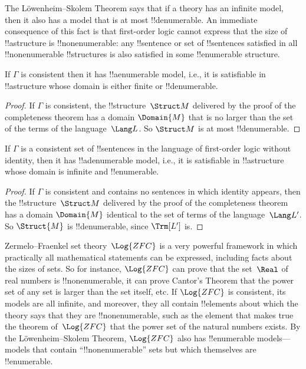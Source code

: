 \documentclass[../../../include/open-logic-section]{subfiles}
\begin{document}

The L\"owenheim--Skolem Theorem says that if a theory has an infinite
model, then it also has a model that is at most !!{denumerable}. An
immediate consequence of this fact is that first-order logic cannot
express that the size of !!a{structure} is !!{nonenumerable}: any
!!{sentence} or set of !!{sentence}s satisfied in all
!!{nonenumerable} !!{structure}s is also satisfied in some
!!{enumerable} structure.

\begin{thm} 
 If $\Gamma$ is consistent then it has
!!a{enumerable} model, i.e., it is satisfiable in !!a{structure}
whose domain is either finite or !!{denumerable}.
\end{thm}

\begin{proof}
If $\Gamma$ is consistent, the !!{structure}~$\Struct M$ delivered by
the proof of the completeness theorem has a domain $\Domain{M}$ that
is no larger than the set of the terms of the language~$\Lang L$. So
$\Struct M$ is at most !!{denumerable}.
\end{proof}

\begin{thm}
 If $\Gamma$ is a consistent set of !!{sentence}s
in the language of first-order logic without identity, then it has
!!a{denumerable} model, i.e., it is satisfiable in !!a{structure}
whose domain is infinite and !!{enumerable}.
\end{thm}

\begin{proof}
If $\Gamma$ is consistent and contains no sentences in which identity
appears, then the !!{structure}~$\Struct M$ delivered by the proof of
the completeness theorem has a domain $\Domain{M}$ identical to the set
of terms of the language~$\Lang L'$. So $\Struct{M}$ is
!!{denumerable}, since $\Trm[L']$ is.
\end{proof}

\begin{ex}
Zermelo--Fraenkel set theory~$\Log{ZFC}$ is a very powerful framework
in which practically all mathematical statements can be expressed,
including facts about the sizes of sets. So for instance, $\Log{ZFC}$
can prove that the set~$\Real$ of real numbers is !!{nonenumerable},
it can prove Cantor's Theorem that the power set of any set is larger
than the set itself, etc.  If $\Log{ZFC}$ is consistent, its models
are all infinite, and moreover, they all contain !!{element}s about
which the theory says that they are !!{nonenumerable}, such as the
element that makes true the theorem of~$\Log{ZFC}$ that the power set
of the natural numbers exists. By the L\"owenheim--Skolem Theorem,
$\Log{ZFC}$ also has !!{enumerable} models---models that contain
``!!{nonenumerable}'' sets but which themselves are !!{enumerable}.
\end{ex}
\end{document}
